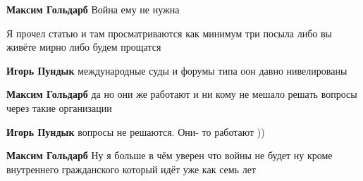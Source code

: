 \begin{itemize}
\begin{itemize}
 
\textbf{Максим Гольдарб} Война ему не нужна

 
Я прочел статью и там просматриваются как минимум три посыла либо вы живёте мирно либо будем прощатся

 
\textbf{Игорь Пундык} международные суды и форумы типа оон давно нивелированы

 
\textbf{Максим Гольдарб} да но они же работают и ни кому не мешало решать вопросы через такие организации

 
\textbf{Игорь Пундык} вопросы не решаются. Они- то работают ))

 
\textbf{Максим Гольдарб} Ну я больше в чём уверен что войны не будет ну кроме внутреннего гражданского который идёт уже как семь лет
\end{itemize}


\end{itemize}
